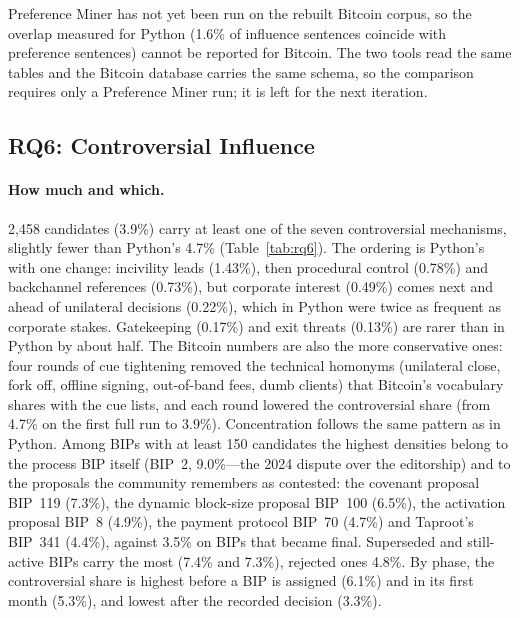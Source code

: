 \documentclass[sigconf,screen]{acmart}
\begin{document}
Preference Miner has not yet been run on the rebuilt Bitcoin corpus, so the overlap measured for Python (1.6\% of influence sentences coincide with preference sentences) cannot be reported for Bitcoin. The two tools read the same tables and the Bitcoin database carries the same schema, so the comparison requires only a Preference Miner run; it is left for the next iteration.

\subsection{RQ6: Controversial Influence}
\label{sec:rq6}

\paragraph{How much and which.} 2,458 candidates (3.9\%) carry at least one of the seven controversial mechanisms, slightly fewer than Python's 4.7\% (Table~\ref{tab:rq6}). The ordering is Python's with one change: incivility leads (1.43\%), then procedural control (0.78\%) and backchannel references (0.73\%), but corporate interest (0.49\%) comes next and ahead of unilateral decisions (0.22\%), which in Python were twice as frequent as corporate stakes. Gatekeeping (0.17\%) and exit threats (0.13\%) are rarer than in Python by about half. The Bitcoin numbers are also the more conservative ones: four rounds of cue tightening removed the technical homonyms (unilateral close, fork off, offline signing, out-of-band fees, dumb clients) that Bitcoin's vocabulary shares with the cue lists, and each round lowered the controversial share (from 4.7\% on the first full run to 3.9\%). Concentration follows the same pattern as in Python. Among BIPs with at least 150 candidates the highest densities belong to the process BIP itself (BIP~2, 9.0\%---the 2024 dispute over the editorship) and to the proposals the community remembers as contested: the covenant proposal BIP~119 (7.3\%), the dynamic block-size proposal BIP~100 (6.5\%), the activation proposal BIP~8 (4.9\%), the payment protocol BIP~70 (4.7\%) and Taproot's BIP~341 (4.4\%), against 3.5\% on BIPs that became final. Superseded and still-active BIPs carry the most (7.4\% and 7.3\%), rejected ones 4.8\%. By phase, the controversial share is highest before a BIP is assigned (6.1\%) and in its first month (5.3\%), and lowest after the recorded decision (3.3\%).
\end{document}
